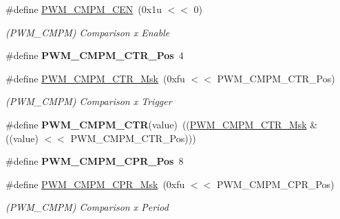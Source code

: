 \begin{DoxyCompactItemize}
\mbox{\label{group__SAME70__PWM_gad3f9538f09a306acf682d98930f2a954}} 
\#define \mbox{\hyperlink{group__SAME70__PWM_gad3f9538f09a306acf682d98930f2a954}{P\+W\+M\+\_\+\+C\+M\+P\+M\+\_\+\+C\+EN}}~(0x1u $<$$<$ 0)
\begin{DoxyCompactList}\small\item\em (P\+W\+M\+\_\+\+C\+M\+PM) Comparison x Enable \end{DoxyCompactList}\item 
\mbox{\label{group__SAME70__PWM_gaf57626ea1939e8f352300ecf93be1439}} 
\#define {\bfseries P\+W\+M\+\_\+\+C\+M\+P\+M\+\_\+\+C\+T\+R\+\_\+\+Pos}~4
\item 
\mbox{\label{group__SAME70__PWM_ga32b8e7533c5db154116c6f8797e18bdc}} 
\#define \mbox{\hyperlink{group__SAME70__PWM_ga32b8e7533c5db154116c6f8797e18bdc}{P\+W\+M\+\_\+\+C\+M\+P\+M\+\_\+\+C\+T\+R\+\_\+\+Msk}}~(0xfu $<$$<$ P\+W\+M\+\_\+\+C\+M\+P\+M\+\_\+\+C\+T\+R\+\_\+\+Pos)
\begin{DoxyCompactList}\small\item\em (P\+W\+M\+\_\+\+C\+M\+PM) Comparison x Trigger \end{DoxyCompactList}\item 
\mbox{\label{group__SAME70__PWM_gac20d4465cd3dc1f875cfe5060df67630}} 
\#define {\bfseries P\+W\+M\+\_\+\+C\+M\+P\+M\+\_\+\+C\+TR}(value)~((\mbox{\hyperlink{group__SAMV71__PWM_ga32b8e7533c5db154116c6f8797e18bdc}{P\+W\+M\+\_\+\+C\+M\+P\+M\+\_\+\+C\+T\+R\+\_\+\+Msk}} \& ((value) $<$$<$ P\+W\+M\+\_\+\+C\+M\+P\+M\+\_\+\+C\+T\+R\+\_\+\+Pos)))
\item 
\mbox{\label{group__SAME70__PWM_ga081a29a209b1ea5b419265afa240cdaa}} 
\#define {\bfseries P\+W\+M\+\_\+\+C\+M\+P\+M\+\_\+\+C\+P\+R\+\_\+\+Pos}~8
\item 
\mbox{\label{group__SAME70__PWM_ga7951fd10abe22d74f4c2c6e9802a3f2d}} 
\#define \mbox{\hyperlink{group__SAME70__PWM_ga7951fd10abe22d74f4c2c6e9802a3f2d}{P\+W\+M\+\_\+\+C\+M\+P\+M\+\_\+\+C\+P\+R\+\_\+\+Msk}}~(0xfu $<$$<$ P\+W\+M\+\_\+\+C\+M\+P\+M\+\_\+\+C\+P\+R\+\_\+\+Pos)
\begin{DoxyCompactList}\small\item\em (P\+W\+M\+\_\+\+C\+M\+PM) Comparison x Period \end{DoxyCompactList}\item 

\end{DoxyCompactItemize}
